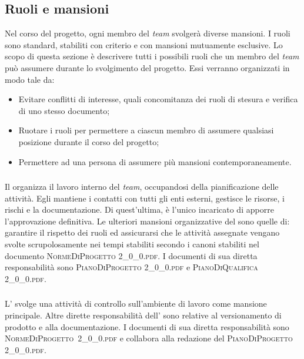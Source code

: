 	\subsection{Ruoli e mansioni}
	Nel corso del progetto, ogni membro del \textit{team} svolgerà diverse mansioni. I ruoli sono standard, stabiliti con criterio e con mansioni mutuamente esclusive. Lo scopo di questa sezione è descrivere tutti i possibili ruoli che un membro del \textit{team} può assumere durante lo svolgimento del progetto. Essi verranno organizzati in modo tale da:
	\begin{itemize}
		\item Evitare conflitti di interesse, quali concomitanza dei ruoli di stesura e verifica di uno stesso documento;
		\item Ruotare i ruoli per permettere a ciascun membro di assumere qualsiasi posizione durante il corso del progetto;
		\item Permettere ad una persona di assumere più mansioni contemporaneamente.
	\end{itemize}

		\subsubsection{\RdP}
		Il \textit{\RdP} organizza il lavoro interno del \textit{team}, occupandosi della pianificazione delle attività. Egli mantiene i contatti con tutti gli enti esterni, gestisce le risorse, i rischi e la documentazione. Di quest'ultima, è l'unico incaricato di apporre l'approvazione definitiva. Le ulteriori mansioni organizzative del \textit{\RdP} sono quelle di: garantire il rispetto dei ruoli ed assicurarsi che le attività assegnate vengano svolte scrupolosamente nei tempi stabiliti secondo i canoni stabiliti nel documento \textsc{NormeDiProgetto 2\_0\_0.pdf}. I documenti di sua diretta responsabilità sono \textsc{PianoDiProgetto 2\_0\_0.pdf} e \textsc{PianoDiQualifica 2\_0\_0.pdf}.

		\subsubsection{\Amm}
		L'\textit{\Amm} svolge una attività di controllo sull'ambiente di lavoro come mansione principale. Altre dirette responsabilità dell'\textit{\Amm} sono relative al versionamento di prodotto e alla documentazione. I documenti di sua diretta responsabilità sono \hbox{\textsc{NormeDiProgetto 2\_0\_0.pdf}} e collabora alla redazione del \textsc{PianoDiProgetto 2\_0\_0.pdf}.
		
